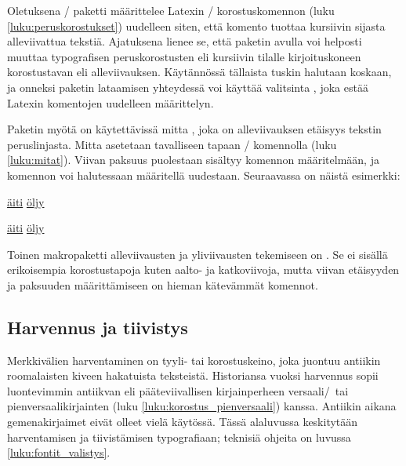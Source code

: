 Oletuksena \-/ paketti määrittelee Latexin
\-/ korostuskomennon (luku \ref{luku:peruskorostukset})
uudelleen siten, että komento tuottaa kursiivin sijasta alleviivattua
tekstiä. Ajatuksena lienee se, että paketin avulla voi helposti muuttaa
typografisen peruskorostusten eli kursiivin tilalle kirjoituskoneen
korostustavan eli alleviivauksen. Käytännössä tällaista tuskin halutaan
koskaan, ja onneksi paketin lataamisen yhteydessä voi käyttää valitsinta
, joka estää Latexin komentojen uudelleen
määrittelyn.

\begin{koodilohkosis}
\usepackage[normalem]{ulem}
\end{koodilohkosis}

Paketin  myötä on käytettävissä mitta ,
joka on alleviivauksen etäisyys tekstin peruslinjasta. Mitta asetetaan
tavalliseen tapaan \-/ komennolla (luku
\ref{luku:mitat}). Viivan paksuus puolestaan sisältyy komennon
 määritelmään, ja komennon voi halutessaan
määritellä uudestaan. Seuraavassa on näistä esimerkki:

\begin{koodilohkosis}
\setlength{\ULdepth}{.2ex}        %
\renewcommand{\ULthickness}{.1ex} %
\uline{äiti} \uline{öljy}
\end{koodilohkosis}

\begin{tulossis}
  \setlength{\ULdepth}{.2ex}
  \renewcommand{\ULthickness}{.1ex}
  \uline{äiti} \uline{öljy}
\end{tulossis}

Toinen makropaketti alleviivausten ja yliviivausten tekemiseen on
. Se ei sisällä erikoisempia korostustapoja
kuten aalto- ja katkoviivoja, mutta viivan etäisyyden ja paksuuden
määrittämiseen on hieman kätevämmät komennot.

\subsection{Harvennus ja tiivistys}
\label{luku:korostus_harvennus}

Merkkivälien harventaminen on tyyli- tai korostuskeino, joka juontuu
antiikin roomalaisten kiveen hakatuista teksteistä. Historiansa vuoksi
harvennus sopii luontevimmin antiikvan eli pääteviivallisen
kirjainperheen versaali\-/\ tai pienversaalikirjainten (luku
\ref{luku:korostus_pienversaali}) kanssa. Antiikin aikana
gemenakirjaimet eivät olleet vielä käytössä. Tässä alaluvussa
keskitytään harventamisen ja tiivistämisen typografiaan; teknisiä
ohjeita on luvussa \ref{luku:fontit_valistys}.

